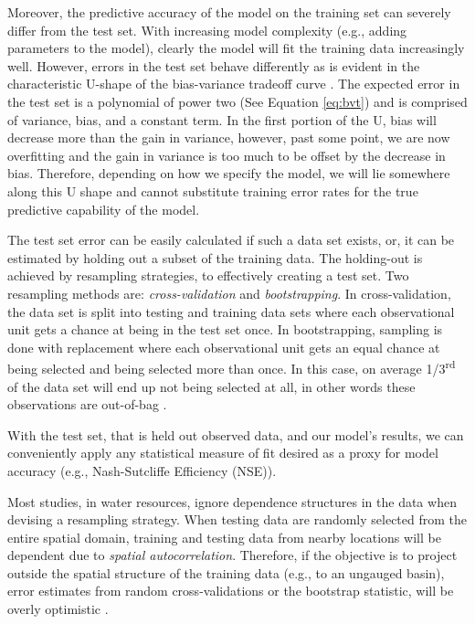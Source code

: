 Moreover, the predictive accuracy of the model on the training set can severely differ from the test set. With increasing model complexity (e.g., adding parameters to the model), clearly the model will fit the training data increasingly well. However, errors in the test set behave differently as is evident in the characteristic U-shape of the bias-variance tradeoff curve \cite{friedman2001elements}. The expected error in the test set is a polynomial of power two (See Equation \ref{eq:bvt}) and is comprised of variance, bias, and a constant term. In the first portion of the U, bias will decrease more than the gain in variance, however, past some point, we are now overfitting and the gain in variance is too much to be offset by the decrease in bias. Therefore, depending on how we specify the model, we will lie somewhere along this U shape and cannot substitute training error rates for the true predictive capability of the model. 

The test set error can be easily calculated if such a data set exists, or, it can be estimated by holding out a subset of the training data. The holding-out is achieved by resampling strategies, to effectively creating a test set. Two resampling methods are: \textit{cross-validation} and \textit{bootstrapping}. In cross-validation, the data set is split into testing and training data sets where each observational unit gets a chance at being in the test set once. In bootstrapping, sampling is done with replacement where each observational unit gets an equal chance at being selected and being selected more than once. In this case, on average 1/3\textsuperscript{rd} of the data set will end up not being selected at all, in other words these observations are out-of-bag \cite{efron1997improvements}. 

With the test set, that is held out observed data, and our model's results, we can conveniently apply any statistical measure of fit desired as a proxy for model accuracy (e.g., Nash-Sutcliffe Efficiency (NSE)). 

Most studies, in water resources, ignore dependence structures in the data when devising a resampling strategy. When testing data are randomly selected from the entire spatial domain, training and testing data from nearby locations will be dependent due to \textit{spatial autocorrelation}. Therefore, if the objective is to project outside the spatial structure of the training data (e.g., to an ungauged basin), error estimates from random cross-validations or the bootstrap statistic, will be overly optimistic \cite{roberts2017cross}. 

